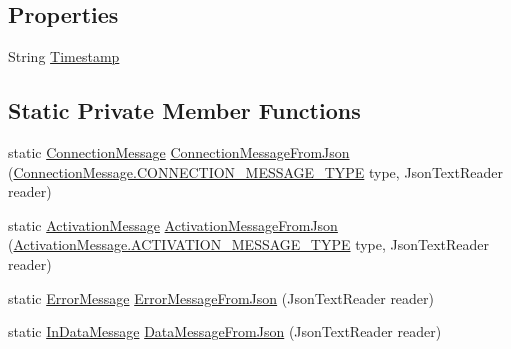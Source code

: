 \subsection*{Properties}
\begin{DoxyCompactItemize}
\item 
String \hyperlink{class_web_analyzer_1_1_models_1_1_message_model_1_1_message_a9054d90256bf9ad8de33d975d2a188d3}{Timestamp}
\end{DoxyCompactItemize}
\subsection*{Static Private Member Functions}
\begin{DoxyCompactItemize}
\item 
static \hyperlink{class_web_analyzer_1_1_models_1_1_message_model_1_1_connection_message}{Connection\+Message} \hyperlink{class_web_analyzer_1_1_models_1_1_message_model_1_1_message_a314276c1b58a764cb8216c85aecbc251}{Connection\+Message\+From\+Json} (\hyperlink{class_web_analyzer_1_1_models_1_1_message_model_1_1_connection_message_a0b8ebc456d3aed9c51235f2a1a1a1cdb}{Connection\+Message.\+C\+O\+N\+N\+E\+C\+T\+I\+O\+N\+\_\+\+M\+E\+S\+S\+A\+G\+E\+\_\+\+T\+Y\+P\+E} type, Json\+Text\+Reader reader)
\item 
static \hyperlink{class_web_analyzer_1_1_models_1_1_message_model_1_1_activation_message}{Activation\+Message} \hyperlink{class_web_analyzer_1_1_models_1_1_message_model_1_1_message_a00da0edc16e3cd335dbc128c04d865de}{Activation\+Message\+From\+Json} (\hyperlink{class_web_analyzer_1_1_models_1_1_message_model_1_1_activation_message_ad3b5847039dd26527a842c6f7675b1b2}{Activation\+Message.\+A\+C\+T\+I\+V\+A\+T\+I\+O\+N\+\_\+\+M\+E\+S\+S\+A\+G\+E\+\_\+\+T\+Y\+P\+E} type, Json\+Text\+Reader reader)
\item 
static \hyperlink{class_web_analyzer_1_1_models_1_1_message_model_1_1_error_message}{Error\+Message} \hyperlink{class_web_analyzer_1_1_models_1_1_message_model_1_1_message_a8a0c7229b12b93ecea85d87799507906}{Error\+Message\+From\+Json} (Json\+Text\+Reader reader)
\item 
static \hyperlink{class_web_analyzer_1_1_models_1_1_message_model_1_1_in_data_message}{In\+Data\+Message} \hyperlink{class_web_analyzer_1_1_models_1_1_message_model_1_1_message_a09f5ab44d912bea7b3ae5e2a78eab490}{Data\+Message\+From\+Json} (Json\+Text\+Reader reader)
\item 

\end{DoxyCompactItemize}
